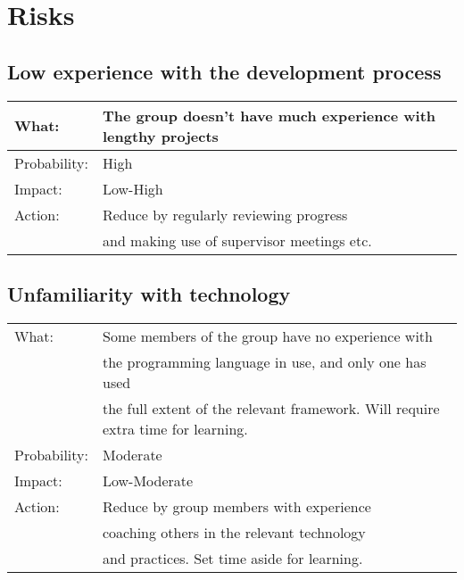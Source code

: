 \documentclass[12pt, a4paper]{article}
\begin{document}
\section{Risks}
\subsection{Low experience with the development process}
\begin{tabular}{| l | l |}
	\hline
	What: & The group doesn't have much experience with lengthy projects\\
	\hline
	Probability: & High \\
	\hline
	Impact: & Low-High \\
	\hline
	Action: & Reduce by regularly reviewing progress\\
	& and making use of supervisor meetings etc.\\
	\hline

\end{tabular}

\subsection{Unfamiliarity with technology}
\begin{tabular}{| l | l |}
	\hline
	What: & Some members of the group have no experience with\\
	& the programming language in use, and only one has used \\
	& the full extent of the relevant framework. Will require extra time for learning.\\
	\hline
	Probability: & Moderate \\
	\hline
	Impact: & Low-Moderate \\
	\hline
	Action: & Reduce by group members with experience \\
	& coaching others in the relevant technology\\
	& and practices. Set time aside for learning.\\
	\hline

\end{tabular}
\end{document}
